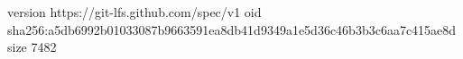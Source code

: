 version https://git-lfs.github.com/spec/v1
oid sha256:a5db6992b01033087b9663591ea8db41d9349a1e5d36c46b3b3c6aa7c415ae8d
size 7482
